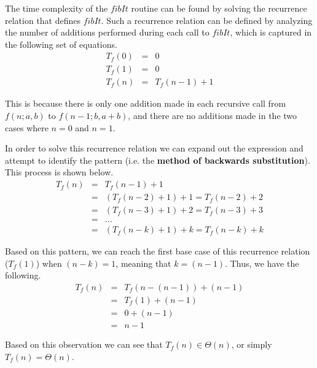 \documentclass[11pt]{article}
\begin{document}
\begin{prob}{2}
\end{prob}
\begin{sol}

The time complexity of the $fibIt$ routine can be found by solving the recurrence relation that defines $fibIt$. Such a recurrence relation can be defined by analyzing the number of additions performed during each call to $fibIt$, which is captured in the following set of equations.
\begin{eqnarray*}
T_{f}(0) & = & 0 \\
T_{f}(1) & = & 0 \\
T_{f}(n) & = & T_{f}(n-1) + 1
\end{eqnarray*}

This is because there is only one addition made in each recursive call from $f(n;a,b)$ to $f(n-1;b,a+b)$, and there are no additions made in the two cases where $n = 0$ and $n = 1$.

In order to solve this recurrence relation we can expand out the expression and attempt to identify the pattern (i.e. the \textbf{method of backwards substitution}). This process is shown below.
\begin{eqnarray*}
T_{f}(n) & = & T_{f}(n - 1) + 1 \\
& = & (T_{f}(n - 2) + 1) + 1 = T_{f}(n - 2) + 2 \\
& = & (T_{f}(n - 3) + 1) + 2 = T_{f}(n - 3) + 3 \\
& = & ... \\
& = & (T_{f}(n - k) + 1) + k = T_{f}(n - k) + k
\end{eqnarray*}

Based on this pattern, we can reach the first base case of this recurrence relation ($T_{f}(1)$) when $(n - k) = 1$, meaning that $k = (n - 1)$. Thus, we have the following.
\begin{eqnarray*}
T_{f}(n) & = & T_{f}(n - (n - 1)) + (n - 1)  \\
& = & T_{f}(1) + (n - 1) \\
& = & 0 + (n - 1) \\
& = & n - 1
\end{eqnarray*}

Based on this observation we can see that $T_{f}(n) \in \Theta(n)$, or simply $T_{f}(n) = \Theta(n)$. 




\end{sol}
\end{document}

